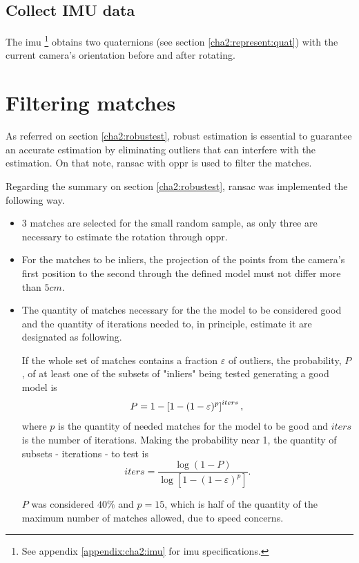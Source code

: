 \subsection{Collect IMU data}
The \acrlong{imu} \footnote{See appendix \ref{appendix:cha2:imu} for \acrshort{imu} specifications.} obtains two quaternions (see section \ref{cha2:represent:quat}) with the current camera's orientation before and after rotating.

\section{Filtering matches}

As referred on section \ref{cha2:robustest}, robust estimation is essential to guarantee an accurate estimation by eliminating outliers that can interfere with the estimation. On that note, \acrshort{ransac} with \acrshort{oppr} is used to filter the matches.

Regarding the summary on section \ref{cha2:robustest}, \acrshort{ransac} was implemented the following way.

\begin{itemize}
	\item 3 matches are selected for the small random sample, as only three are necessary to estimate the rotation through \acrshort{oppr}.
	\item For the matches to be inliers, the projection of the points from the camera's first position to the second through the defined model must not differ more than $ 5 cm$.
	\item The quantity of matches necessary for the the model to be considered good and the quantity of iterations needed to, in principle, estimate it are designated as following.
	
	If the whole set of matches contains a fraction $\varepsilon$ of outliers, the probability, $P$, of at least one of the subsets of "inliers" being tested generating a good model is 
	\begin{equation}
	P=1-\left[1-(1-\varepsilon)^{p}\right]^{iters},\\
	\end{equation}
	where $p$ is the quantity of needed matches for the model to be good and $iters$ is the number of iterations. \cite{detep}
	Making the probability near 1, the quantity of subsets - iterations - to test is
	\begin{equation}
	iters = \frac{\log (1-P)}{\log \left[1-(1-\varepsilon)^{p}\right]}.
	\end{equation}
	
	$P$ was considered $40\%$ and $p = 15$, which is half of the quantity of the maximum number of matches allowed, due to speed concerns. 
\end{itemize}

